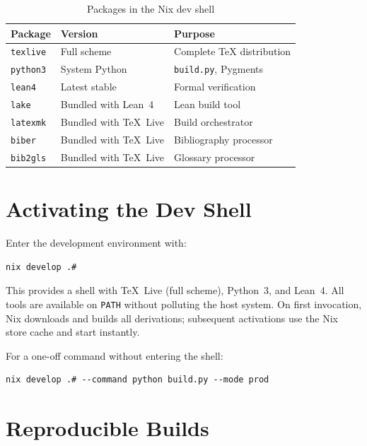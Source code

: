 \begin{table}[htbp]
  \centering
  \caption{Packages in the Nix dev shell}
  \label{tab:nix-packages}
  \begin{tabular}{@{}llp{}@{}}
    \toprule
    \textbf{Package} & \textbf{Version} & \textbf{Purpose} \\
    \midrule
    \texttt{texlive} & Full scheme & Complete \TeX{} distribution \\
    \texttt{python3} & System Python & \texttt{build.py}, Pygments \\
    \texttt{lean4}  & Latest stable & Formal verification \\
    \texttt{lake}   & Bundled with Lean~4 & Lean build tool \\
    \texttt{latexmk} & Bundled with TeX~Live & Build orchestrator \\
    \texttt{biber}  & Bundled with TeX~Live & Bibliography processor \\
    \texttt{bib2gls} & Bundled with TeX~Live & Glossary processor \\
    \bottomrule
  \end{tabular}
\end{table}

\section{Activating the Dev Shell}

Enter the development environment with:

\begin{verbatim}
nix develop .#
\end{verbatim}

This provides a shell with TeX~Live (full scheme), Python~3, and
Lean~4.  All tools are available on \texttt{PATH} without polluting the
host system.  On first invocation, Nix downloads and builds all
derivations; subsequent activations use the Nix store cache and start
instantly.

For a one-off command without entering the shell:

\begin{verbatim}
nix develop .# --command python build.py --mode prod
\end{verbatim}

\section{Reproducible Builds}

